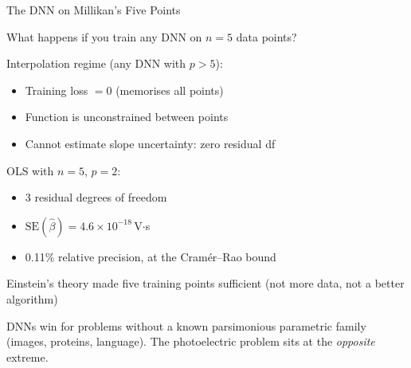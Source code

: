 \documentclass[aspectratio=169]{beamer}
\begin{document}
\begin{frame}{The DNN on Millikan's Five Points}

What happens if you train any DNN on $n = 5$ data points?

\medskip
Interpolation regime (any DNN with $p > 5$):
\begin{itemize}
  \item Training loss $= 0$ (memorises all points)
  \item Function is unconstrained between points
  \item Cannot estimate slope uncertainty: zero residual df
\end{itemize}

\medskip
OLS with $n=5$, $p=2$:
\begin{itemize}
  \item 3 residual degrees of freedom
  \item $\mathrm{SE}(\hat\beta) = 4.6\times10^{-18}$\,V$\cdot$s
  \item 0.11\% relative precision, at the Cram\'er--Rao bound
\end{itemize}

\medskip
Einstein's theory made
five training points sufficient (not more data, not a better algorithm)

\medskip
DNNs win for problems without a known parsimonious parametric family
(images, proteins, language). The photoelectric problem sits at the
\emph{opposite} extreme.

\end{frame}
\end{document}
